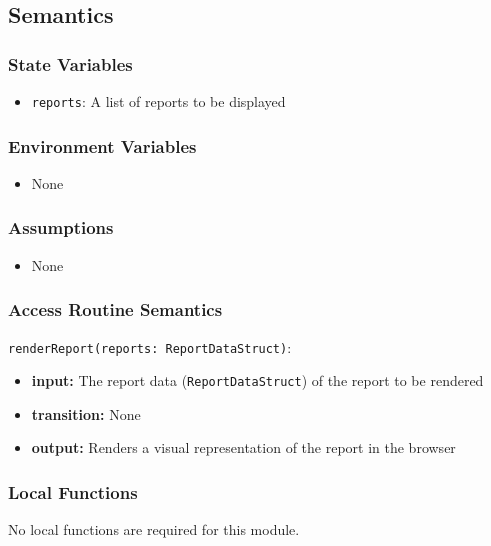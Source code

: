 \documentclass[12pt, titlepage]{article}
\begin{document}
\subsection{Semantics}

\subsubsection{State Variables}

\begin{itemize}
    \item \texttt{reports}: A list of reports to be displayed
\end{itemize}

\subsubsection{Environment Variables}

\begin{itemize}
    \item None
\end{itemize}

\subsubsection{Assumptions}

\begin{itemize}
    \item None
\end{itemize}

\subsubsection{Access Routine Semantics}

\noindent \texttt{renderReport(reports: ReportDataStruct)}:
\begin{itemize}
    \item \textbf{input:} The report data (\texttt{ReportDataStruct}) of the report to be rendered
    \item \textbf{transition:} None
    \item \textbf{output:} Renders a visual representation of the report in the browser
\end{itemize}

\subsubsection{Local Functions}
No local functions are required for this module.
\end{document}
